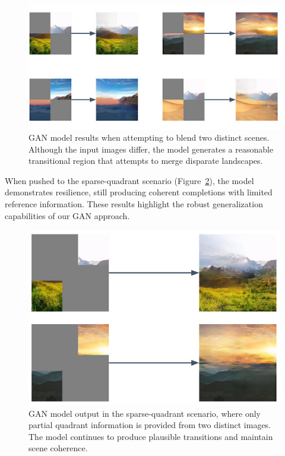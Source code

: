 \documentclass[sigconf]{acmart}
\begin{document}
\begin{figure}[h!]
    \centering
    \includegraphics[width=\linewidth]{gan_step_4}
    \caption{GAN model results when attempting to blend two distinct scenes. Although the input images differ, the model generates a reasonable transitional region that attempts to merge disparate landscapes.}
    \label{fig:gan_step_4}
\end{figure}

When pushed to the sparse-quadrant scenario (Figure~\ref{fig:gan_step_6}), the model demonstrates resilience, still producing coherent completions with limited reference information. These results highlight the robust generalization capabilities of our GAN approach.

\begin{figure}[h!]
    \centering
    \includegraphics[width=\linewidth]{gan_step_6}
    \caption{GAN model output in the sparse-quadrant scenario, where only partial quadrant information is provided from two distinct images. The model continues to produce plausible transitions and maintain scene coherence.}
    \label{fig:gan_step_6}
\end{figure}
\end{document}
